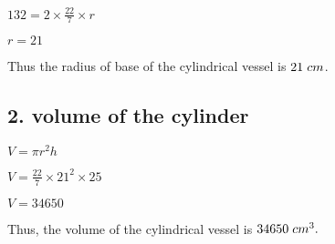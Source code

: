\documentclass{article}
\begin{document}
$132 = 2\times\frac{22}{7}\times{r}$

\vspace{1mm}

$r = 21$

\begin{center}
    \large{Thus the radius of base of the cylindrical vessel is $21 \hspace{1mm}cm$.}
\end{center}

\vspace{2mm}

\subsection*{2. volume of the cylinder}

\vspace{2mm}

$V = \pi{r^2h}$

\vspace{1mm}

$V = \frac{22}{7}\times21^2\times25$

\vspace{1mm}

$V = 34650$

\vspace{1mm}

\begin{center}
    \large{Thus, the volume of the cylindrical vessel is $34650 \hspace{1mm} cm^3.$}
\end{center}
\end{document}
